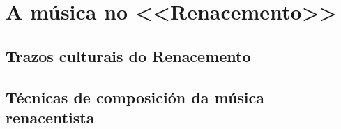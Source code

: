 %
%
\section{A música no <<Renacemento>> } 
%

\subsection*{Trazos culturais do Renacemento}
%


\subsection*{Técnicas de composición da música renacentista}
